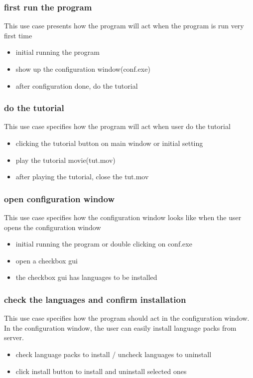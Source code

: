 \documentclass[conference]{IEEEtran}
\begin{document}
\subsubsection{first run the program}
This use case presents how the program will act when the program is run very first time
\begin{itemize}
  \item initial running the program
  \item show up the configuration window(conf.exe)
  \item after configuration done, do the tutorial
\end{itemize}
\textit{}



\subsubsection{do the tutorial}
This use case specifies how the program will act when user do the tutorial
\begin{itemize}
  \item clicking the tutorial button on main window or initial setting 
  \item play the tutorial movie(tut.mov)
  \item after playing the tutorial, close the tut.mov
\end{itemize}
\textit{}



\subsubsection{open configuration window}
This use case specifies how the configuration window looks like when the user opens the configuration window
\begin{itemize}
  \item initial running the program or double clicking on conf.exe
  \item open a checkbox gui
  \item the checkbox gui has languages to be installed
\end{itemize}
\textit{}



\subsubsection{check the languages and confirm installation}
This use case specifies how the program should act in the configuration window. In the configuration window, the user can easily install language packs from server.
\begin{itemize}
  \item check language packs to install / uncheck languages to uninstall
  \item click install button to install and uninstall selected ones
\end{itemize}
\textit{}
\end{document}

